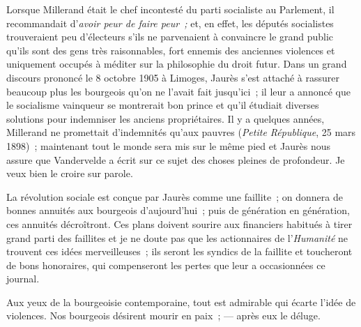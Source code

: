 \documentclass[french,twoside]{book} %
\begin{document}
Lorsque Millerand était le chef incontesté du parti socialiste au Parlement, il recommandait d’\emph{avoir peur de faire peur ;} et, en effet, les députés socialistes trouveraient peu d’électeurs s’ils ne parvenaient à convaincre le grand public qu’ils sont des gens très raisonnables, fort ennemis des anciennes violences et uniquement occupés à méditer sur la philosophie du droit futur. Dans un grand discours prononcé le 8 octobre 1905 à Limoges, Jaurès s’est attaché à rassurer beaucoup plus les bourgeois qu’on ne l’avait fait jusqu’ici ; il leur a annoncé que le socialisme vainqueur se montrerait bon prince et qu’il étudiait diverses solutions pour indemniser les anciens propriétaires. Il y a quelques années, Millerand ne promettait d’indemnités qu’aux pauvres (\emph{Petite République}, 25 mars 1898) ; maintenant tout le monde sera mis sur le même pied et Jaurès nous assure que Vandervelde a écrit sur ce sujet des choses pleines de profondeur. Je veux bien le croire sur parole.\par
 La révolution sociale est conçue par Jaurès comme une faillite ; on donnera de bonnes annuités aux bourgeois d’aujourd’hui ; puis de génération en génération, ces annuités décroîtront. Ces plans doivent sourire aux financiers habitués à tirer grand parti des faillites et je ne doute pas que les actionnaires de l’\emph{Humanité} ne trouvent ces idées merveilleuses ; ils seront les syndics de la faillite et toucheront de bons honoraires, qui compenseront les pertes que leur a occasionnées ce journal.\par
Aux yeux de la bourgeoisie contemporaine, tout est admirable qui écarte l’idée de violences. Nos bourgeois désirent mourir en paix ; — après eux le déluge.
\end{document}
